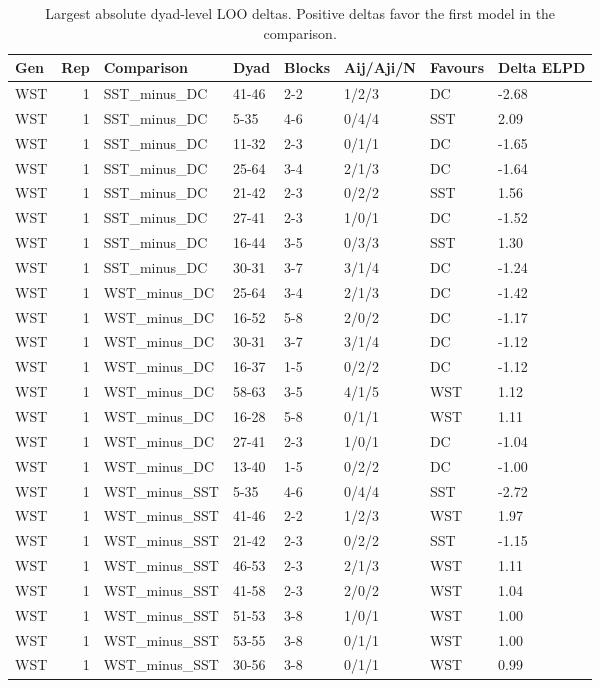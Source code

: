 \begin{table}[!h]
\centering
\caption{Largest absolute dyad-level LOO deltas. Positive deltas favor the first model in the comparison.}
\centering
\begin{tabular}[t]{lrllllll}
\toprule
Gen & Rep & Comparison & Dyad & Blocks & Aij/Aji/N & Favours & Delta ELPD\\
\midrule
WST & 1 & SST_minus_DC & 41-46 & 2-2 & 1/2/3 & DC & -2.68\\
WST & 1 & SST_minus_DC & 5-35 & 4-6 & 0/4/4 & SST & 2.09\\
WST & 1 & SST_minus_DC & 11-32 & 2-3 & 0/1/1 & DC & -1.65\\
WST & 1 & SST_minus_DC & 25-64 & 3-4 & 2/1/3 & DC & -1.64\\
WST & 1 & SST_minus_DC & 21-42 & 2-3 & 0/2/2 & SST & 1.56\\
\addlinespace
WST & 1 & SST_minus_DC & 27-41 & 2-3 & 1/0/1 & DC & -1.52\\
WST & 1 & SST_minus_DC & 16-44 & 3-5 & 0/3/3 & SST & 1.30\\
WST & 1 & SST_minus_DC & 30-31 & 3-7 & 3/1/4 & DC & -1.24\\
WST & 1 & WST_minus_DC & 25-64 & 3-4 & 2/1/3 & DC & -1.42\\
WST & 1 & WST_minus_DC & 16-52 & 5-8 & 2/0/2 & DC & -1.17\\
\addlinespace
WST & 1 & WST_minus_DC & 30-31 & 3-7 & 3/1/4 & DC & -1.12\\
WST & 1 & WST_minus_DC & 16-37 & 1-5 & 0/2/2 & DC & -1.12\\
WST & 1 & WST_minus_DC & 58-63 & 3-5 & 4/1/5 & WST & 1.12\\
WST & 1 & WST_minus_DC & 16-28 & 5-8 & 0/1/1 & WST & 1.11\\
WST & 1 & WST_minus_DC & 27-41 & 2-3 & 1/0/1 & DC & -1.04\\
\addlinespace
WST & 1 & WST_minus_DC & 13-40 & 1-5 & 0/2/2 & DC & -1.00\\
WST & 1 & WST_minus_SST & 5-35 & 4-6 & 0/4/4 & SST & -2.72\\
WST & 1 & WST_minus_SST & 41-46 & 2-2 & 1/2/3 & WST & 1.97\\
WST & 1 & WST_minus_SST & 21-42 & 2-3 & 0/2/2 & SST & -1.15\\
WST & 1 & WST_minus_SST & 46-53 & 2-3 & 2/1/3 & WST & 1.11\\
\addlinespace
WST & 1 & WST_minus_SST & 41-58 & 2-3 & 2/0/2 & WST & 1.04\\
WST & 1 & WST_minus_SST & 51-53 & 3-8 & 1/0/1 & WST & 1.00\\
WST & 1 & WST_minus_SST & 53-55 & 3-8 & 0/1/1 & WST & 1.00\\
WST & 1 & WST_minus_SST & 30-56 & 3-8 & 0/1/1 & WST & 0.99\\
\bottomrule
\end{tabular}
\end{table}
